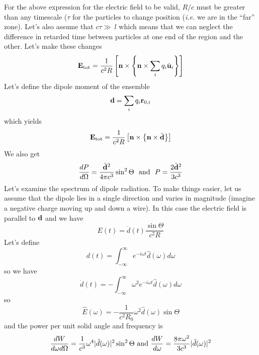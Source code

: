 For the above expression for the electric field to be valid, $R/c$
must be greater than any timescale ($\tau$ for the particles to change
position ({\em i.e.} we are in the ``far'' zone).  Let's also assume that
$c\tau \gg\ l$ which means that we can neglect the difference in
retarded time between particles at one end of the region and the
other.  Let's make these changes
\begin{equation}
{\bf E}_{\hbox{\rm \scriptsize tot}} = \frac{1}{c^2 R} 
 \left [ {\bf n} \times
    \left \{ {\bf n} \times  \sum_i q_i \dot{\bf u}_i \right \} \right ] 
\label{eq:224}
\end{equation}
Let's define the dipole moment of the ensemble
\begin{equation}
{\bf d} = \sum_i q_i {\bf r}_{0,i}
\label{eq:225}
\end{equation}
which yields
\begin{equation}
{\bf E}_{\hbox{\rm \scriptsize tot}} = \frac{1}{c^2 R} 
 \left [ {\bf n} \times
    \left \{ {\bf n} \times  \ddot {\bf d} \right \} \right ] 
\label{eq:226}
\end{equation}
We also get
\begin{equation}
\frac{d P}{d \Omega} = \frac{\ddot{\bf d}^2}{4\pi c^3} \sin^2 \Theta
~~\hbox{\rm and}~~ P=\frac{2 \ddot{\bf d}^2}{3c^3}
\label{eq:227}
\end{equation}
Let's examine the spectrum of dipole radiation.  To make things
easier, let us assume that the dipole lies in a single direction and
varies in magnitude (imagine a negative charge moving up and down a
wire).  In this case the electric field is parallel to ${\bf d}$ and
we have
\begin{equation}
E(t) = \ddot{d} (t) \frac{\sin \Theta}{c^2 R}
\label{eq:228}
\end{equation}
Let's define 
\begin{equation}
d(t) = \int_{-\infty}^\infty e^{-i\omega t} {\hat d}(\omega) d \omega
\label{eq:229}
\end{equation}
so we have
\begin{equation}
\ddot{d}(t) = -\int_{-\infty}^\infty \omega^2 e^{-i\omega t} {\hat d}(\omega) d \omega
\label{eq:230}
\end{equation}
so
\begin{equation}
{\hat E}(\omega) = - \frac{1}{c^2 R_0} \omega^2 {\hat d}(\omega) \sin \Theta
\label{eq:231}
\end{equation}
and the power per unit solid angle and frequency is
\begin{equation}
\frac{dW}{d \omega d\Omega} = \frac{1}{c^3} \omega^4 |{\hat
  d}(\omega)|^2 \sin^2 \Theta ~\hbox{\rm and}~ \frac{dW}{d\omega} =
\frac{8\pi \omega^2}{3c^3} |{\hat d}(\omega)|^2
\label{eq:232}
\end{equation}

